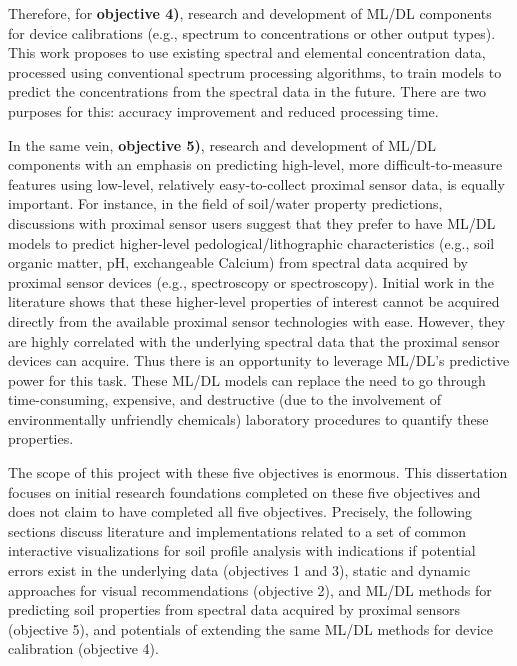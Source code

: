 Therefore, for \textbf{objective 4)}, research and development of ML/DL components for device calibrations (e.g., spectrum to concentrations or other output types). This work proposes to use existing spectral and elemental concentration data, processed using conventional spectrum processing algorithms, to train models to predict the concentrations from the spectral data in the future. There are two purposes for this: accuracy improvement and reduced processing time.


In the same vein, \textbf{objective 5)}, research and development of ML/DL components with an emphasis on predicting high-level, more difficult-to-measure features using low-level, relatively easy-to-collect proximal sensor data, is equally important. For instance, in the field of soil/water property predictions, discussions with proximal sensor users suggest that they prefer to have ML/DL models to predict higher-level pedological/lithographic characteristics (e.g., soil organic matter, pH, exchangeable Calcium) from spectral data acquired by proximal sensor devices (e.g., \pxrf{} spectroscopy or \visnir{} spectroscopy). Initial work in the literature shows that these higher-level properties of interest cannot be acquired directly from the available proximal sensor technologies with ease. However, they are highly correlated with the underlying spectral data that the proximal sensor devices can acquire. Thus there is an opportunity to leverage ML/DL's predictive power for this task. These ML/DL models can replace the need to go through time-consuming, expensive, and destructive (due to the involvement of environmentally unfriendly chemicals) laboratory procedures to quantify these properties.



The scope of this project with these five objectives is enormous. This dissertation focuses on initial research foundations completed on these five objectives and does not claim to have completed all five objectives. Precisely, the following sections discuss literature and implementations related to a set of common interactive visualizations for soil profile analysis with indications if potential errors exist in the underlying data (objectives 1 and 3), static and dynamic approaches for visual recommendations (objective 2), and ML/DL methods for predicting soil properties from spectral data acquired by proximal sensors (objective 5), and potentials of extending the same ML/DL methods for device calibration (objective 4).